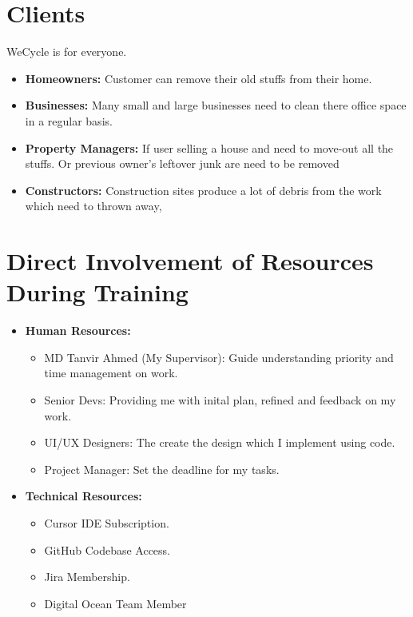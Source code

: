 \section{Clients}
\par WeCycle is for everyone.
\begin{itemize}
    \item \textbf{Homeowners:} Customer can remove their old stuffs from their home.
    \item \textbf{Businesses:} Many small and large businesses need to clean there office space in a regular basis.
    \item \textbf{Property Managers:} If user selling a house and need to move-out all the stuffs. Or previous owner's leftover junk are need to be removed
    \item \textbf{Constructors:} Construction sites produce a lot of debris from the work which need to thrown away,
\end{itemize}

\section{Direct Involvement of Resources During Training}
\begin{itemize}
    \item \textbf{Human Resources:}
    \begin{itemize}
        \item MD Tanvir Ahmed (My Supervisor): Guide understanding priority and time management on work.
        \item Senior Devs: Providing me with inital plan, refined and feedback on my work.
        \item UI/UX Designers: The create the design which I implement using code.
        \item Project Manager: Set the deadline for my tasks.
    \end{itemize}
    \item \textbf{Technical Resources:}
    \begin{itemize}
        \item Cursor IDE Subscription.
        \item GitHub Codebase Access.
        \item Jira Membership.
        \item Digital Ocean Team Member
    \end{itemize}
\end{itemize}

